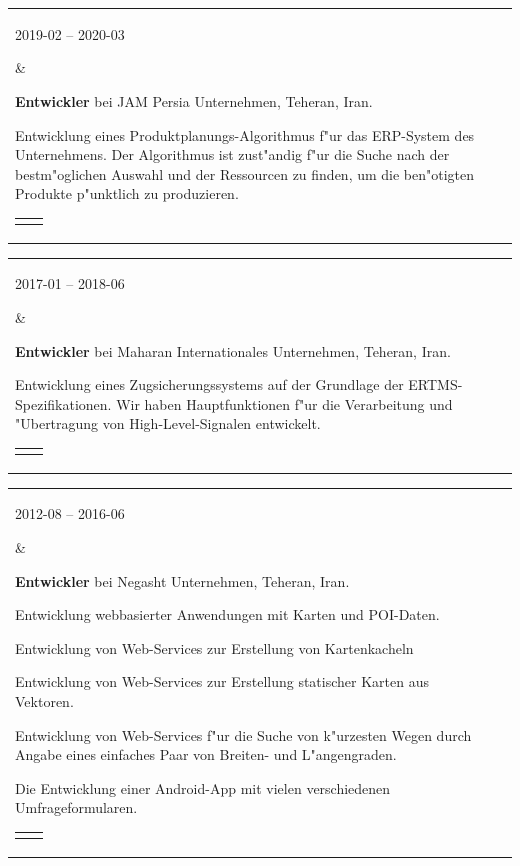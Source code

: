 \documentclass[11pt,a4paper,oneside]{article}
\makeatletter
\newcommand{\prog}{Programmiersprache:}
\newcommand{\os}{Betriebssystem:}
\newcommand{\vcs}{Versionskontrollen:}
\newcommand{\issue}{Problemverfolgung:}
\newenvironment{mytable}{%
\begin{tabular}{@{}l@{\hspace{4mm}}l@{}}%
}{\end{tabular}}
\newcommand{\myitem}[2]{%
\parbox[t]{16mm}{#1}&\parbox[t]{16cm}{#2}\\%
}
\newenvironment{innertable}{%
\begin{tabular}{@{}l@{\hspace{5mm}}l@{}}%
}{\end{tabular}}
\newcommand{\inneritem}[2]{%
\parbox{35mm}{{\color{darkgray}#1}}&\parbox{12cm}{#2}\\%
}
\makeatother
\begin{document}
\begin{mytable}
\myitem{2019-02 -- 2020-03}{%
\textbf{Entwickler} bei
JAM Persia Unternehmen, Teheran, Iran.

Entwicklung eines Produktplanungs-Algorithmus f"ur das ERP-System
des Unternehmens.
Der Algorithmus ist zust"andig f"ur die Suche nach der bestm"oglichen
Auswahl und der Ressourcen zu finden, um die ben"otigten Produkte
p"unktlich zu produzieren.

\begin{innertable}
\inneritem{\prog}{C\#}
\inneritem{\os}{Windows}
\inneritem{\vcs}{SVN}
\inneritem{\issue}{Jira}
\end{innertable}
}
\end{mytable}

\begin{mytable}
\myitem{2017-01 -- 2018-06}{
\textbf{Entwickler} bei
Maharan Internationales Unternehmen, Teheran, Iran.

Entwicklung eines Zugsicherungssystems auf der Grundlage
der ERTMS-Spezifikationen.
Wir haben Hauptfunktionen f"ur die Verarbeitung und "Ubertragung
von High-Level-Signalen entwickelt.

\begin{innertable}
\inneritem{\prog}{C mit Frama-C}
\inneritem{\os}{Windows}
\inneritem{\vcs}{TFS}
\inneritem{\issue}{Microsoft Project}
\end{innertable}
}
\end{mytable}

\begin{mytable}
\myitem{2012-08 -- 2016-06}{
\textbf{Entwickler} bei
Negasht Unternehmen, Teheran, Iran.

Entwicklung webbasierter Anwendungen mit Karten und POI-Daten.

Entwicklung von Web-Services zur Erstellung von Kartenkacheln

Entwicklung von Web-Services zur Erstellung statischer Karten
aus Vektoren.

Entwicklung von Web-Services f"ur die Suche von k"urzesten Wegen
durch Angabe eines einfaches Paar von Breiten- und L"angengraden.

Die Entwicklung einer Android-App mit vielen verschiedenen
Umfrageformularen.

\begin{innertable}
\inneritem{\prog}{C\#, JavaScript, C++, und Java}
\inneritem{\os}{Windows}
\inneritem{\vcs}{Microsoft Visual SourceSafe}
\inneritem{\issue}{Unternehmensspezifische Fehlerverfolgung}
\end{innertable}
}
\end{mytable}
\end{document}
